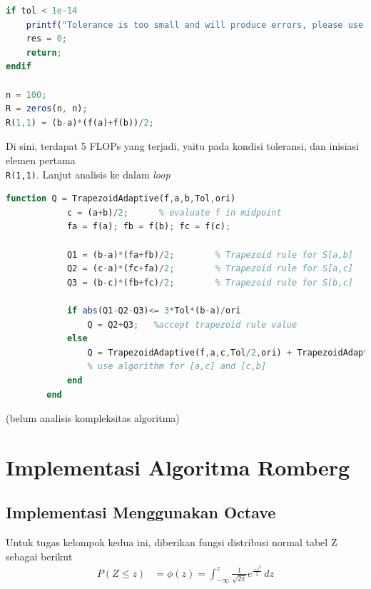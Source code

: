 \documentclass[journal,12pt,onecolumn,a4paper]{IEEEtran}
\begin{document}
\begin{center}
	\begin{lstlisting}[language=Octave]
if tol < 1e-14
	printf("Tolerance is too small and will produce errors, please use larger values\n")
	res = 0;
	return;
endif

n = 100;
R = zeros(n, n);
R(1,1) = (b-a)*(f(a)+f(b))/2;
	\end{lstlisting}
\end{center}

Di sini, terdapat 5 FLOPs yang terjadi, yaitu pada kondisi toleransi, dan inisiasi elemen pertama \\ \lstinline{R(1,1)}. Lanjut analisis ke dalam \emph{loop}
\begin{center}
	\begin{lstlisting}[language=Octave]
		function Q = TrapezoidAdaptive(f,a,b,Tol,ori)
			c = (a+b)/2;      % evaluate f in midpoint
			fa = f(a); fb = f(b); fc = f(c);

			Q1 = (b-a)*(fa+fb)/2;        % Trapezoid rule for S[a,b]
			Q2 = (c-a)*(fc+fa)/2;        % Trapezoid rule for S[a,c]
			Q3 = (b-c)*(fb+fc)/2;        % Trapezoid rule for S[b,c]

			if abs(Q1-Q2-Q3)<= 3*Tol*(b-a)/ori
				Q = Q2+Q3;   %accept trapezoid rule value
			else
				Q = TrapezoidAdaptive(f,a,c,Tol/2,ori) + TrapezoidAdaptive(f,c,b,Tol/2,ori);
				% use algorithm for [a,c] and [c,b]
			end
		end
	\end{lstlisting}
\end{center}

(belum analisis kompleksitas algoritma)

\section{Implementasi Algoritma Romberg}

\subsection{Implementasi Menggunakan Octave}

\par Untuk tugas kelompok kedua ini, diberikan fungsi distribusi normal tabel Z sebagai berikut
\begin{equation*}
	\begin{split}
		P(Z \le z ) & = \phi(z) = \int_{-\infty}^{z} \frac{1}{\sqrt{2\pi}}e ^{\frac{-z^2}{2}} \,dz
	\end{split}
\end{equation*}
\end{document}
